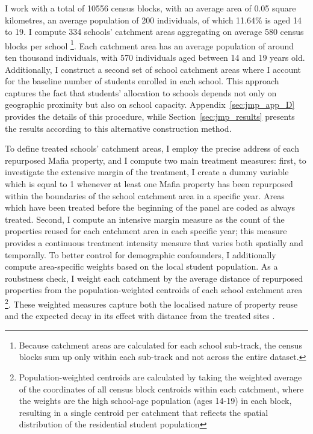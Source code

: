 \documentclass[12pt]{article}
\theoremstyle{plain}
\theoremstyle{plain}
\theoremstyle{plain}
\theoremstyle{definition}
\theoremstyle{plain}
\theoremstyle{definition}
\theoremstyle{plain}
\theoremstyle{remark}
\theoremstyle{definition}
\theoremstyle{definition}
\theoremstyle{plain}
\begin{document}
I work with a total of 10556 census blocks, with an average area of 0.05 square kilometres, an average population of 200 individuals, of which 11.64\% is aged 14 to 19. I compute 334 schools' catchment areas aggregating on average 580 census blocks per school \footnote{Because catchment areas are calculated for each school sub-track, the census blocks sum up only within each sub-track and not across the entire dataset.}. Each catchment area has an average population of around ten thousand individuals,  with 570 individuals aged between 14 and 19 years old. Additionally, I construct a second set of school catchment areas where I account for the baseline number of students enrolled in each school. This approach captures the fact that students’ allocation to schools depends not only on geographic proximity but also on school capacity. Appendix~\ref{sec:jmp_app_D} provides the details of this procedure, while Section~\ref{sec:jmp_results} presents the results according to this alternative construction method. \par
\medskip
To define treated schools' catchment areas, I employ the precise address of each repurposed Mafia property, and I compute two main treatment measures: first, to investigate the extensive margin of the treatment, I create a dummy variable which is equal to 1 whenever at least one Mafia property has been repurposed within the boundaries of the school catchment area in a specific year. Areas which have been treated before the beginning of the panel are coded as always treated. Second, I compute an intensive margin measure as the count of the properties reused for each catchment area in each specific year;  this measure provides a continuous treatment intensity measure that varies both spatially and temporally. To better control for demographic confounders, I additionally compute area-specific weights based on the local student population. As a roubstness check, I weight each catchment by the average distance of repurposed properties from the population-weighted centroids of each school catchment area \footnote{Population-weighted centroids are calculated by taking the weighted average of the coordinates of all census block centroids within each catchment, where the weights are the high school-age population (ages 14-19) in each block, resulting in a single centroid per catchment that reflects the spatial distribution of the residential student population}. These weighted measures capture both the localised nature of property reuse and the expected decay in its effect with distance from the treated sites \citep{boeri_localized_2023, damm_does_2014}. \\
\end{document}
